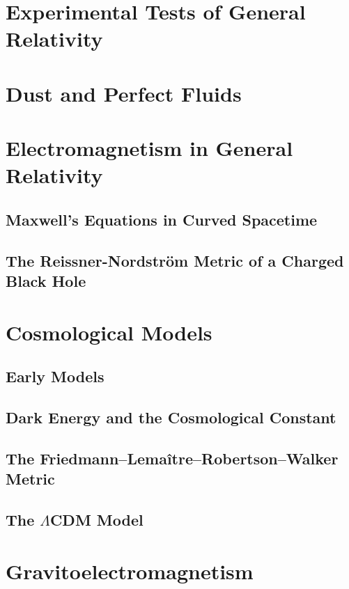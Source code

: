 \documentclass[11pt, a4paper]{article}
\begin{document}
\section{Experimental Tests of General Relativity}

\section{Dust and Perfect Fluids}

\section{Electromagnetism in General Relativity}

\subsection{Maxwell's Equations in Curved Spacetime}

\subsection{The Reissner-Nordstr{\"o}m Metric of a Charged Black Hole}

\section{Cosmological Models}

\subsection{Early Models}

\subsection{Dark Energy and the Cosmological Constant}

\subsection{The Friedmann–Lemaître–Robertson–Walker Metric}

\subsection{The $\Lambda$CDM Model}

\section{Gravitoelectromagnetism}
\end{document}

